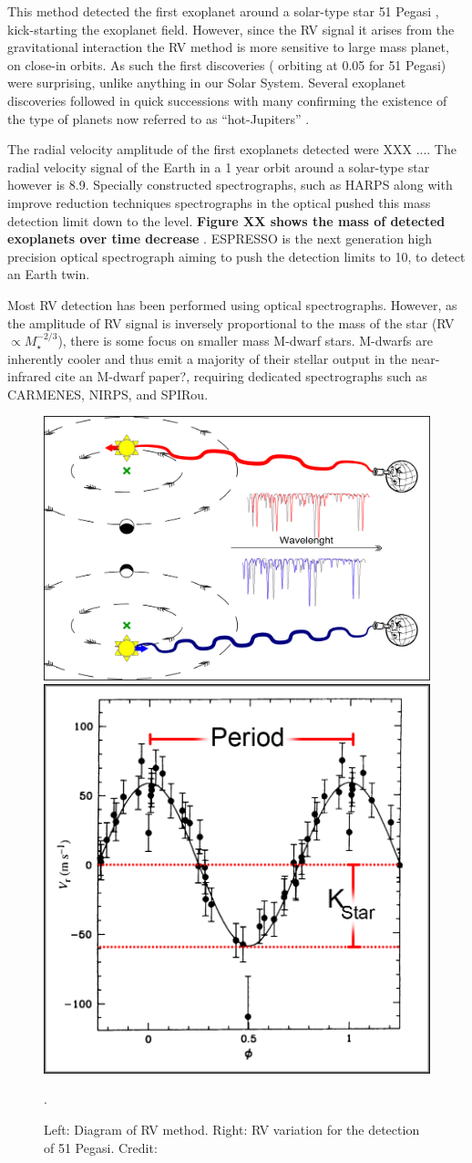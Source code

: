 This method detected the first exoplanet around a solar-type star {51 Pegasi} \citep{mayor_jupitermass_1995}, kick-starting the exoplanet field. However, since the RV signal it arises from the gravitational interaction the RV method is more sensitive to large mass planet, on close-in orbits. As such the first discoveries (\Mjup{} orbiting at 0.05\AU{} for {51 Pegasi}) were surprising, unlike anything in our Solar System. Several exoplanet discoveries followed in quick successions \citep[e.g.][]{butler_planet_1996, marcy_planetary_1996} with many confirming the existence of the type of planets now referred to as ``hot-Jupiters'' \citep{butler_three_1997, charbonneau_detection_2000}.

The radial velocity amplitude of the first exoplanets detected were XXX \kmps.... The radial velocity signal of the Earth in a 1 year orbit around a solar-type star however is 8.9\cmps{}\citep{figueira_radial_2010}.
Specially constructed spectrographs, such as HARPS \citep{mayor_setting_2003)} along with improve reduction techniques \citet{lovis_new_2007} spectrographs in the optical pushed this mass detection limit down to the \mps{} level.\textbf{ Figure XX shows the mass of detected exoplanets over time decrease} . ESPRESSO \citep{pepe_espresso_2014, megevand_espresso_2014} is the next generation high precision optical spectrograph aiming to push the detection limits to 10\cmps, to detect an Earth twin.

Most RV detection has been performed using optical spectrographs. However, as the amplitude of RV signal is inversely proportional to the mass of the star (RV $\propto M_{\star}^{-2/3}$), there is some focus on smaller mass M-dwarf stars. M-dwarfs are inherently cooler and thus emit a majority of their stellar output in the near-infrared {cite an M-dwarf paper?}, requiring dedicated \nir spectrographs such as {CARMENES}, {NIRPS}, and {SPIRou}.

\begin{figure}
    \centering
        \includegraphics[width=0.45\linewidth]{./figures/introduction/RV_Diagram}
    \includegraphics[width=0.3\linewidth]{./figures/introduction/PhaseFolded_51Pegb_Mayor_et_al_1995}
    \caption{Left: Diagram of {RV} method. Right: {RV} variation for the detection of {51 Pegasi}. Credit: \citet{mayor_jupitermass_1995}}.
    \label{fig:rvdiagram-mayor}
\end{figure}


